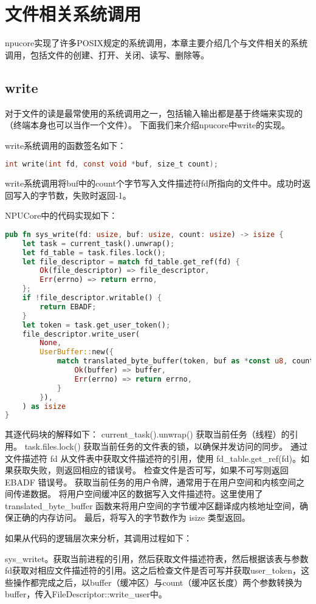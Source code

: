 \section{文件相关系统调用}
npucore实现了许多POSIX规定的系统调用，本章主要介绍几个与文件相关的系统调用，包括文件的创建、打开、关闭、读写、删除等。
\subsection{write}
对于文件的读是最常使用的系统调用之一，包括输入输出都是基于终端来实现的（终端本身也可以当作一个文件）。
下面我们来介绍npucore中write的实现。

write系统调用的函数签名如下：
\begin{lstlisting}[language={C}]
int write(int fd, const void *buf, size_t count);
\end{lstlisting}
write系统调用将buf中的count个字节写入文件描述符fd所指向的文件中。成功时返回写入的字节数，失败时返回-1。

NPUCore中的代码实现如下：
\begin{lstlisting}[language={Rust}, label={lst:write}]
pub fn sys_write(fd: usize, buf: usize, count: usize) -> isize {
    let task = current_task().unwrap();
    let fd_table = task.files.lock();
    let file_descriptor = match fd_table.get_ref(fd) {
        Ok(file_descriptor) => file_descriptor,
        Err(errno) => return errno,
    };
    if !file_descriptor.writable() {
        return EBADF;
    }
    let token = task.get_user_token();
    file_descriptor.write_user(
        None,
        UserBuffer::new({
            match translated_byte_buffer(token, buf as *const u8, count) {
                Ok(buffer) => buffer,
                Err(errno) => return errno,
            }
        }),
    ) as isize
}
\end{lstlisting}
其逐代码块的解释如下：
current_task().unwrap() 获取当前任务（线程）的引用。
task.files.lock() 获取当前任务的文件表的锁，以确保并发访问的同步。
通过文件描述符 fd 从文件表中获取文件描述符的引用，使用 fd_table.get_ref(fd)。如果获取失败，则返回相应的错误号。
检查文件是否可写，如果不可写则返回 EBADF 错误号。
获取当前任务的用户令牌，通常用于在用户空间和内核空间之间传递数据。
将用户空间缓冲区的数据写入文件描述符。这里使用了 translated_byte_buffer 函数来将用户空间的字节缓冲区翻译成内核地址空间，确保正确的内存访问。
最后，将写入的字节数作为 isize 类型返回。

如果从代码的逻辑层次来分析，其调用过程如下：

sys_writet。获取当前进程的引用，然后获取文件描述符表，然后根据该表与参数fd获取对相应文件描述符的引用。这之后检查文件是否可写并获取user_token，这些操作都完成之后，以buffer（缓冲区）与count（缓冲区长度）两个参数转换为buffer，传入FileDescriptor::write_user中。

